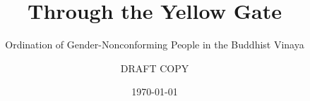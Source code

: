 \clearpage
\thispagestyle{empty}
\titlehead{}
\title{Through the Yellow Gate}
\subtitle{Ordination of Gender-Nonconforming People in the Buddhist Vinaya}
\author{DRAFT COPY}
\date{\today}
\maketitle
